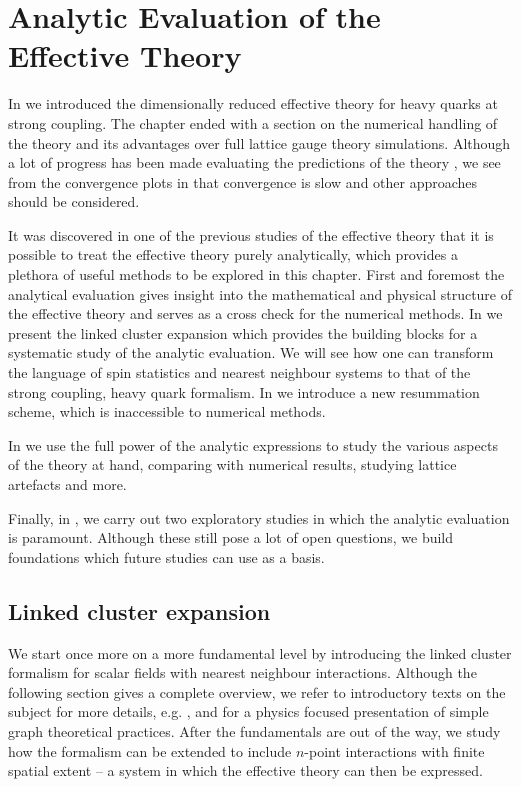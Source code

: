 \chapter{Analytic Evaluation of the Effective Theory} \label{chap5}

In  we introduced the dimensionally reduced effective theory for
heavy quarks at strong coupling. The chapter ended with a section on the
numerical handling of the theory and its advantages over full lattice gauge
theory simulations. Although a lot of progress has been made evaluating the
predictions of the theory \citep{Fromm:2011qi,Fromm:2012eb,Langelage:2014vpa},
we see from the convergence plots in  that
convergence is slow and other approaches should be considered.

It was discovered in one of the previous studies of the effective theory
\citep{Langelage:2014vpa} that it is possible to treat the effective theory
purely analytically, which provides a plethora of useful methods to be explored
in this chapter. First and foremost the analytical evaluation gives insight into
the mathematical and physical structure of the effective theory and serves as a
cross check for the numerical methods. In  we
present the linked cluster expansion which provides the building blocks for
a systematic study of the analytic evaluation. We will see how one can transform
the language of spin statistics and nearest neighbour systems to that of the
strong coupling, heavy quark formalism. In  we
introduce a new resummation scheme, which is inaccessible to numerical methods.

In  we use the full power of the analytic
expressions to study the various aspects of the theory at hand, comparing with
numerical results, studying lattice artefacts and more.

Finally, in , we carry out two
exploratory studies in which the analytic evaluation is paramount. Although
these still pose a lot of open questions, we build foundations which
future studies can use as a basis.

\section{Linked cluster expansion} \label{sec:cluster_expansion}

We start once more on a more fundamental level by introducing the linked cluster
formalism for scalar fields with nearest neighbour interactions. Although the
following section gives a complete overview, we refer to introductory texts
on the subject for more details, e.g. \citep{Wortis:1980zb,Reisz:1995ag}, and
\citep{Domb:1980zb,Martin:1980zb} for a physics focused presentation of simple
graph theoretical practices. After the fundamentals are out of the way, we study
how the formalism can be extended to include $n$-point interactions with
finite spatial extent -- a system in which the effective theory can then be
expressed.

